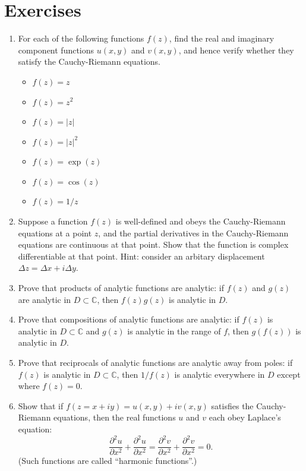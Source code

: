 \documentclass[10pt,a4paper]{article}
\begin{document}
\section{Exercises}

\begin{enumerate}
\item 
For each of the following functions $f(z)$, find the real and
imaginary component functions $u(x,y)$ and $v(x,y)$, and hence verify
whether they satisfy the Cauchy-Riemann equations.
\begin{itemize}
\item $f(z) = z$
\item $f(z) = z^2$
\item $f(z) = |z|$
\item $f(z) = |z|^2$
\item $f(z) = \exp(z)$
\item $f(z) = \cos(z)$
\item $f(z) = 1/z$
\end{itemize}

\item
Suppose a function $f(z)$ is well-defined and obeys the Cauchy-Riemann
equations at a point $z$, and the partial derivatives in the
Cauchy-Riemann equations are continuous at that point. Show that the
function is complex differentiable at that point. Hint: consider an
arbitary displacement $\Delta z = \Delta x + i \Delta y$.

\item
Prove that products of analytic functions are analytic: if $f(z)$ and
$g(z)$ are analytic in $D \subset \mathbb{C}$, then $f(z) g(z)$ is
analytic in $D$.

\item
Prove that compositions of analytic functions are analytic: if $f(z)$
is analytic in $D \subset \mathbb{C}$ and $g(z)$ is analytic in the
range of $f$, then $g(f(z))$ is analytic in $D$.

\item
Prove that reciprocals of analytic functions are analytic away from
poles: if $f(z)$ is analytic in $D \subset \mathbb{C}$, then
$1/f(z)$ is analytic everywhere in $D$ except where $f(z) = 0$.

\item
Show that if $f(z = x + iy) = u(x,y) + i v(x,y)$ satisfies the
Cauchy-Riemann equations, then the real functions $u$ and $v$ each
obey Laplace's equation:
\begin{equation}
  \frac{\partial^2 u}{\partial x^2} + \frac{\partial^2u}{\partial x^2}
  = \frac{\partial^2 v}{\partial x^2} + \frac{\partial^2 v}{\partial x^2} = 0.
\end{equation}
(Such functions are called ``harmonic functions''.)


\end{enumerate}
\end{document}
